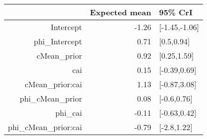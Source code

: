 \begin{tabular}{rrl}
  \hline
 & Expected mean & 95\% CrI \\ 
  \hline
Intercept & -1.26 & [-1.45,-1.06] \\ 
  phi\_Intercept & 0.71 & [0.5,0.94] \\ 
  cMean\_prior & 0.92 & [0.25,1.59] \\ 
  cai & 0.15 & [-0.39,0.69] \\ 
  cMean\_prior:cai & 1.13 & [-0.87,3.08] \\ 
  phi\_cMean\_prior & 0.08 & [-0.6,0.76] \\ 
  phi\_cai & -0.11 & [-0.63,0.42] \\ 
  phi\_cMean\_prior:cai & -0.79 & [-2.8,1.22] \\ 
   \hline
\end{tabular}

